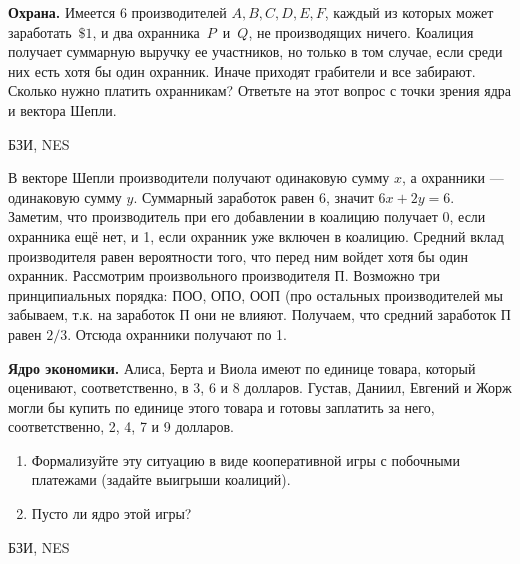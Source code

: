 \begin{problem}
 {\bf Охрана.} Имеется $6$ производителей
$A,B,C,D,E,F$, каждый из которых может заработать~$\$1$, и
два охранника~$P$~и~$Q$, не производящих ничего. Коалиция
получает суммарную выручку ее участников, но только в том
случае, если среди них есть хотя бы один охранник. Иначе
приходят грабители и все забирают. Сколько нужно платить
охранникам? Ответьте на этот вопрос с точки зрения ядра и
вектора Шепли.




\begin{source}
БЗИ, NES
\end{source}


\begin{sol}
В векторе Шепли производители получают одинаковую сумму $x$, а охранники — одинаковую сумму $y$. Суммарный заработок равен 6, значит $6x+2y=6$. Заметим, что производитель при его добавлении в коалицию получает 0, если охранника ещё нет, и 1, если охранник уже включен в коалицию. Средний вклад производителя равен вероятности того, что перед ним войдет хотя бы один охранник. Рассмотрим произвольного производителя П. Возможно три принципиальных порядка: ПОО, ОПО, ООП (про остальных производителей мы забываем, т.к. на заработок П они не влияют. Получаем, что средний заработок П равен $2/3$. Отсюда охранники получают по 1.


\end{sol}
\end{problem}




\begin{problem}
 {\bf Ядро экономики.} Алиса, Берта и Виола имеют по
единице товара, который оценивают, соответственно, в 3, 6 и
8 долларов. Густав, Даниил, Евгений и Жорж могли бы купить
по единице этого товара и готовы заплатить за него,
соответственно, 2, 4, 7 и 9 долларов.
\begin{enumerate}
  \item Формализуйте эту ситуацию в виде кооперативной игры с
  побочными платежами (задайте выигрыши коалиций).
  \item Пусто ли ядро этой игры?
\end{enumerate}




\begin{source}
БЗИ, NES
\end{source}


\begin{sol}

\end{sol}
\end{problem}




